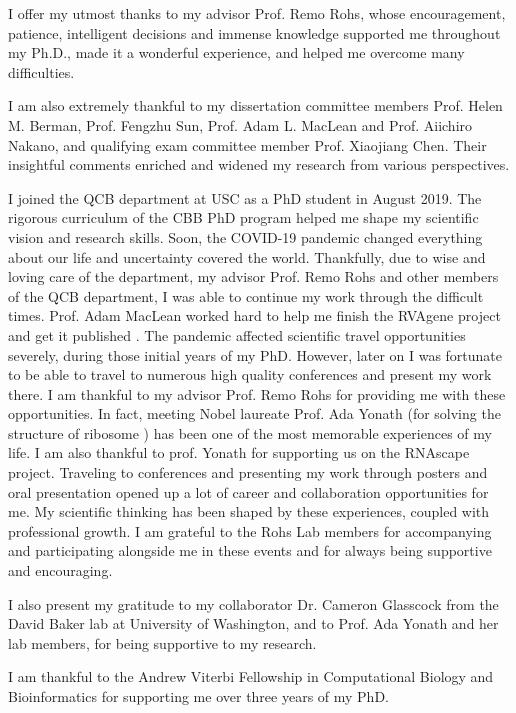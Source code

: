 
I offer my utmost thanks to my advisor Prof. Remo Rohs, whose encouragement, patience, intelligent decisions and immense knowledge supported me throughout my Ph.D., made it a wonderful experience, and helped me overcome many difficulties.

I am also extremely thankful to my dissertation committee members Prof. Helen M. Berman, Prof. Fengzhu Sun, Prof. Adam L. MacLean and Prof. Aiichiro Nakano, and qualifying exam committee member Prof. Xiaojiang Chen. Their insightful comments enriched and widened my research from various perspectives. 

I joined the QCB department at USC as a PhD student in August 2019. The rigorous curriculum of the CBB PhD program helped me shape my scientific vision and research skills. Soon, the COVID-19 pandemic changed everything about our life and uncertainty covered the world. Thankfully, due to wise and loving care of the department, my advisor Prof. Remo Rohs and other members of the QCB department, I was able to continue my work through the difficult times. Prof. Adam MacLean worked hard to help me finish the RVAgene project and get it published \citep{Mitra2021}. The pandemic affected scientific travel opportunities severely, during those initial years of my PhD. However, later on I was fortunate to be able to travel to numerous high quality conferences and present my work there. I am thankful to my advisor Prof. Remo Rohs for providing me with these opportunities. In fact, meeting Nobel laureate Prof. Ada Yonath (for solving the structure of ribosome \citep{schluenzen2000structure, harms2001high}) has been one of the most memorable experiences of my life. I am also thankful to prof. Yonath for supporting us on the RNAscape project. Traveling to conferences and presenting my work through posters and oral presentation opened up a lot of career and collaboration opportunities for me. My scientific thinking has been shaped by these experiences, coupled with professional growth. I am grateful to the Rohs Lab members for accompanying and participating alongside me in these events and for always being supportive and encouraging.

I also present my gratitude to my collaborator Dr. Cameron Glasscock from the David Baker lab at University of Washington, and to Prof. Ada Yonath and her lab members, for being supportive to my research. 

I am thankful to the Andrew Viterbi Fellowship in Computational Biology and Bioinformatics for supporting me over three years of my PhD.

